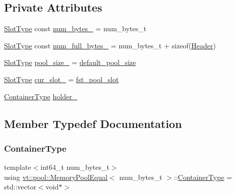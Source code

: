 \subsection*{Private Attributes}
\begin{DoxyCompactItemize}
\item 
\hyperlink{structvt_1_1pool_1_1_memory_pool_equal_a101fdcb943d0cb0863cf17655e0b4e1c}{Slot\+Type} const \hyperlink{structvt_1_1pool_1_1_memory_pool_equal_a9f303ac0fffee08f71f676014d8114a6}{num\+\_\+bytes\+\_\+} = num\+\_\+bytes\+\_\+t
\item 
\hyperlink{structvt_1_1pool_1_1_memory_pool_equal_a101fdcb943d0cb0863cf17655e0b4e1c}{Slot\+Type} const \hyperlink{structvt_1_1pool_1_1_memory_pool_equal_a3ae57a1929e619eb6d346f196e0b1d2d}{num\+\_\+full\+\_\+bytes\+\_\+} = num\+\_\+bytes\+\_\+t + sizeof(\hyperlink{structvt_1_1pool_1_1_header}{Header})
\item 
\hyperlink{structvt_1_1pool_1_1_memory_pool_equal_a101fdcb943d0cb0863cf17655e0b4e1c}{Slot\+Type} \hyperlink{structvt_1_1pool_1_1_memory_pool_equal_a8f5d69e4d35c30c9f9913ccc80350f0a}{pool\+\_\+size\+\_\+} = \hyperlink{structvt_1_1pool_1_1_memory_pool_equal_a67dae02a7795b182a7302b9eb34924e7}{default\+\_\+pool\+\_\+size}
\item 
\hyperlink{structvt_1_1pool_1_1_memory_pool_equal_a101fdcb943d0cb0863cf17655e0b4e1c}{Slot\+Type} \hyperlink{structvt_1_1pool_1_1_memory_pool_equal_aa9298df54e6a541e9dd8960befbf46a5}{cur\+\_\+slot\+\_\+} = \hyperlink{structvt_1_1pool_1_1_memory_pool_equal_ae0435baf515fefccc015b600357bc6bb}{fst\+\_\+pool\+\_\+slot}
\item 
\hyperlink{structvt_1_1pool_1_1_memory_pool_equal_af0be2ff27778be95adc6dad823113c27}{Container\+Type} \hyperlink{structvt_1_1pool_1_1_memory_pool_equal_af8f2b40c8e28f638a675fe5f8b302782}{holder\+\_\+}
\end{DoxyCompactItemize}


\subsection{Member Typedef Documentation}
\mbox{\label{structvt_1_1pool_1_1_memory_pool_equal_af0be2ff27778be95adc6dad823113c27}} 
\subsubsection{\texorpdfstring{Container\+Type}{ContainerType}}
{\footnotesize\ttfamily template$<$int64\+\_\+t num\+\_\+bytes\+\_\+t$>$ \\
using \hyperlink{structvt_1_1pool_1_1_memory_pool_equal}{vt\+::pool\+::\+Memory\+Pool\+Equal}$<$ num\+\_\+bytes\+\_\+t $>$\+::\hyperlink{structvt_1_1pool_1_1_memory_pool_equal_af0be2ff27778be95adc6dad823113c27}{Container\+Type} =  std\+::vector$<$void$\ast$$>$}

